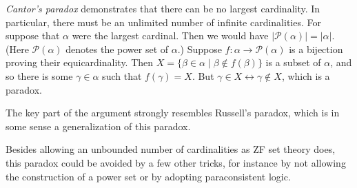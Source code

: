\documentclass[12pt]{article}
\begin{document}
\emph{Cantor's paradox} demonstrates that there can be no largest cardinality.  In particular, there must be an unlimited number of infinite cardinalities.  For suppose that $\alpha$ were the largest cardinal.  Then we would have $|\mathcal{P}(\alpha)|=|\alpha|$.  (Here $\mathcal{P}(\alpha)$ denotes the power set of $\alpha$.)  Suppose $f:\alpha\rightarrow\mathcal{P}(\alpha)$ is a bijection proving their equicardinality.  Then $X=\{\beta\in\alpha\mid \beta\not\in f(\beta)\}$ is a subset of $\alpha$, and so there is some $\gamma\in\alpha$ such that $f(\gamma)=X$.  But $\gamma\in X\leftrightarrow\gamma\notin X$, which is a paradox.

The key part of the argument strongly resembles Russell's paradox, which is in some sense a generalization of this paradox.

Besides allowing an unbounded number of cardinalities as ZF set theory does, this paradox could be avoided by a few other tricks, for instance by not allowing the construction of a power set or by adopting paraconsistent logic.
\end{document}
